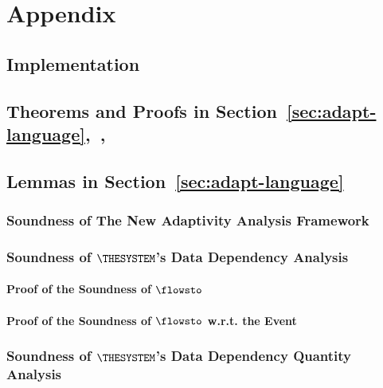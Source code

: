 \chapter{Appendix}
\label{AppC}


\section{Implementation}
\label{appendix:implementation}


\section{Theorems and Proofs in Section~\ref{sec:adapt-language},~,~}
\label{appendix:thm-adaptivity}
\section{Lemmas in Section~\ref{sec:adapt-language}}
\label{apdx:lemma_sec123}

\clearpage
\subsection{Soundness of The New Adaptivity Analysis Framework}
\label{apdx:adapt_soundness}


\clearpage
\subsection{Soundness of $\THESYSTEM$'s Data Dependency Analysis}
\subsubsection{Proof of the Soundness of $\flowsto$}
\label{apdx:flowsto_soundness}

\clearpage
\subsubsection{Proof of the Soundness of $\flowsto$ w.r.t. the Event}
\label{apdx:flowsto_event_soundness}


\clearpage
\subsection{Soundness of $\THESYSTEM$'s Data Dependency Quantity Analysis}
\label{apdx:reachability_soundness}

\clearpage
